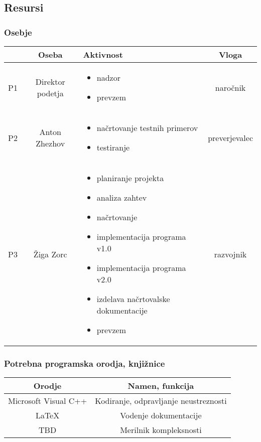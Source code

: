 \documentclass[a4paper,12pt]{article}
\begin{document}
\newpage

	\subsection{Resursi}

		\subsubsection{Osebje}
			\begin{center}
			\begin{tabular}{|c|c|>{\centering}m{}|c|}
				\hline
				&Oseba&Aktivnost&Vloga\\
				\hline
			  P1&Direktor podetja&
			\begin{itemize}
				\item nadzor
				\item prevzem
			\end{itemize}&naročnik\\
				\hline
			  P2&Anton Zhezhov&
				\begin{itemize}
					\item načrtovanje testnih primerov
					\item testiranje
				\end{itemize}&preverjevalec\\
				\hline
			  P3&Žiga Zorc&
				\begin{itemize}
					\item planiranje projekta
					\item analiza zahtev
					\item načrtovanje
					\item implementacija programa v1.0
					\item implementacija programa v2.0
					\item izdelava načrtovalske dokumentacije
					\item prevzem
				\end{itemize}&razvojnik\\
				\hline
			\end{tabular}
			\end{center}
		
		\subsubsection{Potrebna programska orodja, knjižnice}
			\begin{center}
			\begin{tabular}{|c|c|}
					\hline
					\rowcolor{red!30!} Orodje& Namen, funkcija\\
					\hline
					Microsoft Visual C++& Kodiranje, odpravljanje neustreznosti\\
					\hline
					\LaTeX &Vodenje dokumentacije\\
					\hline
					TBD& Merilnik kompleksnosti\\
					\hline
			\end{tabular}
			\end{center}
\end{document}
